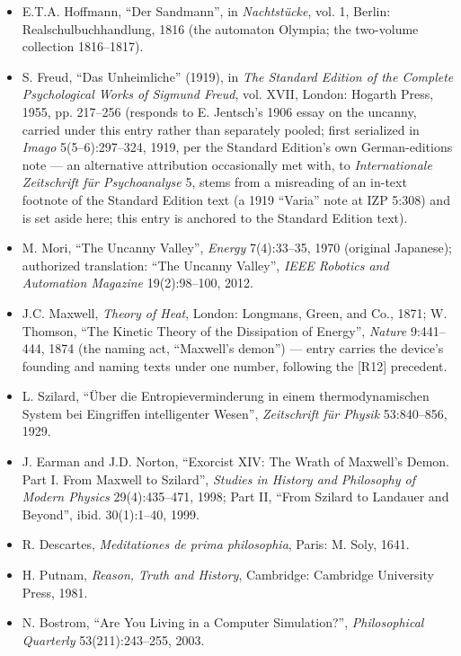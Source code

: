 \documentclass[11pt,a4paper]{article}
\begin{document}
\begin{itemize}[leftmargin=1.6em,itemsep=2pt,parsep=0pt,topsep=3pt]
\item[R58.] E.T.A. Hoffmann, ``Der Sandmann'', in \textit{Nachtstücke}, vol. 1, Berlin: Realschulbuchhandlung, 1816 (the automaton Olympia; the two-volume collection 1816–1817).
\item[R59.] S. Freud, ``Das Unheimliche'' (1919), in \textit{The Standard Edition of the Complete Psychological Works of Sigmund Freud}, vol. XVII, London: Hogarth Press, 1955, pp. 217–256 (responds to E. Jentsch's 1906 essay on the uncanny, carried under this entry rather than separately pooled; first serialized in \textit{Imago} 5(5–6):297–324, 1919, per the Standard Edition's own German-editions note — an alternative attribution occasionally met with, to \textit{Internationale Zeitschrift für Psychoanalyse} 5, stems from a misreading of an in-text footnote of the Standard Edition text (a 1919 ``Varia'' note at IZP 5:308) and is set aside here; this entry is anchored to the Standard Edition text).
\item[R60.] M. Mori, ``The Uncanny Valley'', \textit{Energy} 7(4):33–35, 1970 (original Japanese); authorized translation: ``The Uncanny Valley'', \textit{IEEE Robotics and Automation Magazine} 19(2):98–100, 2012.
\item[R61.] J.C. Maxwell, \textit{Theory of Heat}, London: Longmans, Green, and Co., 1871; W. Thomson, ``The Kinetic Theory of the Dissipation of Energy'', \textit{Nature} 9:441–444, 1874 (the naming act, ``Maxwell's demon'') — entry carries the device's founding and naming texts under one number, following the [R12] precedent.
\item[R62.] L. Szilard, ``Über die Entropieverminderung in einem thermodynamischen System bei Eingriffen intelligenter Wesen'', \textit{Zeitschrift für Physik} 53:840–856, 1929.
\item[R63.] J. Earman and J.D. Norton, ``Exorcist XIV: The Wrath of Maxwell's Demon. Part I. From Maxwell to Szilard'', \textit{Studies in History and Philosophy of Modern Physics} 29(4):435–471, 1998; Part II, ``From Szilard to Landauer and Beyond'', ibid. 30(1):1–40, 1999.
\item[R64.] R. Descartes, \textit{Meditationes de prima philosophia}, Paris: M. Soly, 1641.
\item[R65.] H. Putnam, \textit{Reason, Truth and History}, Cambridge: Cambridge University Press, 1981.
\item[R66.] N. Bostrom, ``Are You Living in a Computer Simulation?'', \textit{Philosophical Quarterly} 53(211):243–255, 2003.
\end{itemize}
\end{document}
